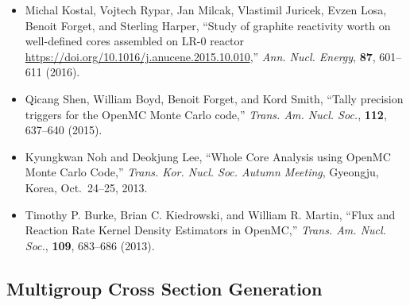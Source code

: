 \begin{itemize}
\item Michal Kostal, Vojtech Rypar, Jan Milcak, Vlastimil Juricek, Evzen Losa,
Benoit Forget, and Sterling Harper, ``Study of graphite reactivity worth on
well-defined cores assembled on LR-0 reactor
\url{https://doi.org/10.1016/j.anucene.2015.10.010},'' \textit{Ann. Nucl. Energy},
\textbf{87}, 601--611 (2016).

\item Qicang Shen, William Boyd, Benoit Forget, and Kord Smith, ``Tally precision
triggers for the OpenMC Monte Carlo code,'' \textit{Trans. Am. Nucl. Soc.}, \textbf{112},
637--640 (2015).

\item Kyungkwan Noh and Deokjung Lee, ``Whole Core Analysis using OpenMC Monte Carlo
Code,'' \textit{Trans. Kor. Nucl. Soc. Autumn Meeting}, Gyeongju, Korea,
Oct.\ 24--25, 2013.

\item Timothy P. Burke, Brian C. Kiedrowski, and William R. Martin, ``Flux and
Reaction Rate Kernel Density Estimators in OpenMC,'' \textit{Trans. Am. Nucl. Soc.},
\textbf{109}, 683--686 (2013).

\end{itemize}

\subsection{Multigroup Cross Section Generation}

